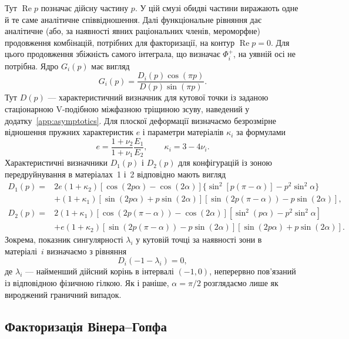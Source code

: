 Тут $\operatorname{Re}p$ позначає дійсну частину $p$. У цій смузі обидві частини виражають одне й те саме аналітичне співвідношення. Далі функціональне рівняння дає аналітичне (або, за наявності явних раціональних членів, мероморфне) продовження комбінацій, потрібних для факторизації, на контур $\operatorname{Re}p=0$. Для цього продовження збіжність самого інтеграла, що визначає $\Phi_i^+$, на уявній осі не потрібна. Ядро $G_i(p)$ має вигляд
\begin{equation*}
  G_i(p)=\frac{D_i(p)\cos(\pi p)}{D(p)\sin(\pi p)}.
\end{equation*}
Тут $D(p)$ — характеристичний визначник для кутової точки із заданою стаціонарною V-подібною міжфазною тріщиною зсуву, наведений у додатку~\ref{app:asymptotics}. Для плоскої деформації визначаємо безрозмірне відношення пружних характеристик $e$ і параметри матеріалів $\kappa_i$ за формулами
\begin{equation*}
  e=\frac{1+\nu_2}{1+\nu_1}\frac{E_1}{E_2},
  \qquad
  \kappa_i=3-4\nu_i.
\end{equation*}
Характеристичні визначники $D_1(p)$ і $D_2(p)$ для конфігурацій із зоною передруйнування в матеріалах~1 і~2 відповідно мають вигляд
\begin{equation*}
\begin{aligned}
  D_1(p)={}&2e(1+\kappa_2)
    [\cos(2p\alpha)-\cos(2\alpha)]
    \{\sin^2[p(\pi-\alpha)]-p^2\sin^2\alpha\}\\
  &+(1+\kappa_1)
    [\sin(2p\alpha)+p\sin(2\alpha)]
    [\sin(2p(\pi-\alpha))-p\sin(2\alpha)],\\[2pt]
  D_2(p)={}&2(1+\kappa_1)
    [\cos(2p(\pi-\alpha))-\cos(2\alpha)]
    [\sin^2(p\alpha)-p^2\sin^2\alpha]\\
  &+e(1+\kappa_2)
    [\sin(2p(\pi-\alpha))-p\sin(2\alpha)]
    [\sin(2p\alpha)+p\sin(2\alpha)].
\end{aligned}
\end{equation*}
Зокрема, показник сингулярності $\lambda_i$ у кутовій точці за наявності зони в матеріалі~$i$ визначаємо з рівняння
\begin{equation*}
  D_i(-1-\lambda_i)=0,
\end{equation*}
де $\lambda_i$ — найменший дійсний корінь в інтервалі $(-1,0)$, неперервно пов’язаний із відповідною фізичною гілкою. Як і раніше, $\alpha=\pi/2$ розглядаємо лише як вироджений граничний випадок.

\subsection{Факторизація Вінера--Гопфа}
\label{subsec:wiener-hopf}

